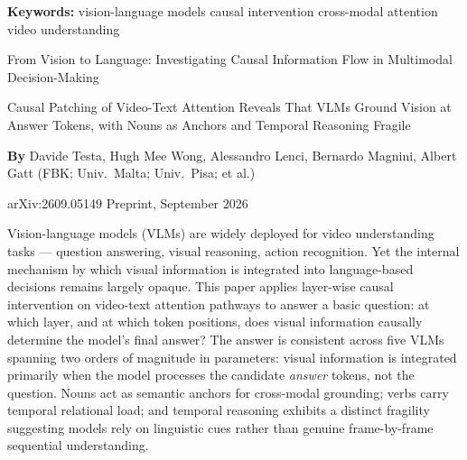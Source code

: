 \documentclass[10pt,twocolumn]{article}
\begin{document}
\setlength{\parindent}{0pt}
\setlength{\parskip}{4pt}

{\small\color{keywordgray}\textbf{Keywords:}
  vision-language models \textbullet{}
  causal intervention \textbullet{}
  cross-modal attention \textbullet{}
  video understanding}\par\vspace{4pt}

{\LARGE\bfseries\raggedright
  From Vision to Language: Investigating Causal
  Information Flow in Multimodal
  Decision-Making}\par\vspace{4pt}

{\large\itshape\raggedright
  Causal Patching of Video-Text Attention Reveals
  That VLMs Ground Vision at Answer Tokens,
  with Nouns as Anchors and Temporal Reasoning Fragile}\par\vspace{6pt}

{\small\textbf{By} Davide Testa, Hugh Mee Wong, Alessandro Lenci,
  Bernardo Magnini, Albert Gatt
  (FBK; Univ.\ Malta; Univ.\ Pisa; et al.)}\par\vspace{2pt}

{\small\color{keywordgray}arXiv:2609.05149 \textbullet{} Preprint, September 2026}
\par\vspace{2pt}\noindent{\color{rulered}\rule{\columnwidth}{0.6pt}}\vspace{6pt}

Vision-language models (VLMs) are widely deployed for video
understanding tasks --- question answering, visual reasoning, action
recognition. Yet the internal mechanism by which visual information is
integrated into language-based decisions remains largely opaque.
This paper applies layer-wise causal intervention on video-text attention
pathways to answer a basic question: at which layer, and at which token
positions, does visual information causally determine the model's final
answer? The answer is consistent across five VLMs spanning two orders of
magnitude in parameters: visual information is integrated primarily when
the model processes the candidate \emph{answer} tokens, not the question.
Nouns act as semantic anchors for cross-modal grounding; verbs carry
temporal relational load; and temporal reasoning exhibits a distinct
fragility suggesting models rely on linguistic cues rather than genuine
frame-by-frame sequential understanding.
\end{document}
